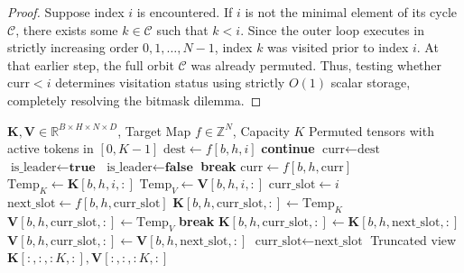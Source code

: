\documentclass[journal,10pt,twocolumn]{article}
\begin{document}
\begin{proof}
Suppose index $i$ is encountered. If $i$ is not the minimal element of its cycle $\mathcal{C}$, there exists some $k \in \mathcal{C}$ such that $k < i$. Since the outer loop executes in strictly increasing order $0, 1, \dots, N-1$, index $k$ was visited prior to index $i$. At that earlier step, the full orbit $\mathcal{C}$ was already permuted. Thus, testing whether $\text{curr} < i$ determines visitation status using strictly $O(1)$ scalar storage, completely resolving the bitmask dilemma.
\end{proof}

\begin{algorithm}[t]
\caption{In-Place Cycle-Leader KV Compaction}
\label{alg:compact}
\begin{algorithmic}[1]
\Require $\mathbf{K}, \mathbf{V} \in \mathbb{R}^{B \times H \times N \times D}$, Target Map $f \in \mathbb{Z}^N$, Capacity $K$
\Ensure Permuted tensors with active tokens in $[0, K-1]$
            \State $\text{dest} \gets f[b, h, i]$
             
                \State \textbf{continue}
            \EndIf
            \State $\text{curr} \gets \text{dest}$
            \State $\text{is\_leader} \gets \textbf{true}$
                    \State $\text{is\_leader} \gets \textbf{false}$
                    \State \textbf{break}
                \EndIf
                \State $\text{curr} \gets f[b, h, \text{curr}]$
            \EndWhile
                \State $\text{Temp}_K \gets \mathbf{K}[b, h, i, :]$ 
                \State $\text{Temp}_V \gets \mathbf{V}[b, h, i, :]$
                \State $\text{curr\_slot} \gets i$
                    \State $\text{next\_slot} \gets f[b, h, \text{curr\_slot}]$
                        \State $\mathbf{K}[b, h, \text{curr\_slot}, :] \gets \text{Temp}_K$
                        \State $\mathbf{V}[b, h, \text{curr\_slot}, :] \gets \text{Temp}_V$
                        \State \textbf{break}
                    \Else
                        \State $\mathbf{K}[b, h, \text{curr\_slot}, :] \gets \mathbf{K}[b, h, \text{next\_slot}, :]$
                        \State $\mathbf{V}[b, h, \text{curr\_slot}, :] \gets \mathbf{V}[b, h, \text{next\_slot}, :]$
                        \State $\text{curr\_slot} \gets \text{next\_slot}$
                    \EndIf
                \EndWhile
            \EndIf
        \EndFor
    \EndFor
\EndFor
\State \Return Truncated view $\mathbf{K}[:, :, :K, :], \mathbf{V}[:, :, :K, :]$
\end{algorithmic}
\end{algorithm}
\end{document}
